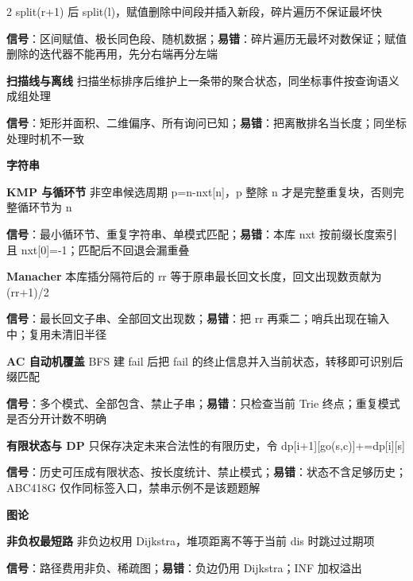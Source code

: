 \documentclass[UTF8,fontset=fandol,a4paper,twoside]{ctexart}
\newcommand{\topic}[1]{\par\smallskip\textbf{#1}\par\nobreak}
\begin{document}
\begin{multicols}{2}
split(\allowbreak{}r+\allowbreak{}1)\allowbreak{} 后 split(\allowbreak{}l)\allowbreak{}，赋值删除中间段并插入新段，碎片遍历不保证最坏快\par
\textbf{信号}：区间赋值、极长同色段、随机数据；\textbf{易错}：碎片遍历无最坏对数保证；赋值删除的迭代器不能再用，先分右端再分左端\par
\par\textbf{扫描线与离线}\quad
扫描坐标排序后维护上一条带的聚合状态，同坐标事件按查询语义成组处理\par
\textbf{信号}：矩形并面积、二维偏序、所有询问已知；\textbf{易错}：把离散排名当长度；同坐标处理时机不一致\par
\topic{字符串}
\par\textbf{KMP 与循环节}\quad
非空串候选周期 p=\allowbreak{}n-\allowbreak{}nxt[\allowbreak{}n]\allowbreak{}，p 整除 n 才是完整重复块，否则完整循环节为 n\par
\textbf{信号}：最小循环节、重复字符串、单模式匹配；\textbf{易错}：本库 nxt 按前缀长度索引且 nxt[\allowbreak{}0]\allowbreak{}=\allowbreak{}-\allowbreak{}1；匹配后不回退会漏重叠\par
\par\textbf{Manacher}\quad
本库插分隔符后的 rr 等于原串最长回文长度，回文出现数贡献为 (\allowbreak{}rr+\allowbreak{}1)\allowbreak{}/\allowbreak{}2\par
\textbf{信号}：最长回文子串、全部回文出现数；\textbf{易错}：把 rr 再乘二；哨兵出现在输入中；复用未清旧半径\par
\par\textbf{AC 自动机覆盖}\quad
BFS 建 fail 后把 fail 的终止信息并入当前状态，转移即可识别后缀匹配\par
\textbf{信号}：多个模式、全部包含、禁止子串；\textbf{易错}：只检查当前 Trie 终点；重复模式是否分开计数不明确\par
\par\textbf{有限状态与 DP}\quad
只保存决定未来合法性的有限历史，令 dp[\allowbreak{}i+\allowbreak{}1]\allowbreak{}[\allowbreak{}go(\allowbreak{}s,\allowbreak{}c)\allowbreak{}]\allowbreak{}+\allowbreak{}=\allowbreak{}dp[\allowbreak{}i]\allowbreak{}[\allowbreak{}s]\allowbreak{}\par
\textbf{信号}：历史可压成有限状态、按长度统计、禁止模式；\textbf{易错}：状态不含足够历史；ABC418G 仅作同标签入口，禁串示例不是该题题解\par
\topic{图论}
\par\textbf{非负权最短路}\quad
非负边权用 Dijkstra，堆项距离不等于当前 dis 时跳过过期项\par
\textbf{信号}：路径费用非负、稀疏图；\textbf{易错}：负边仍用 Dijkstra；INF 加权溢出\par

\end{multicols}
\end{document}
